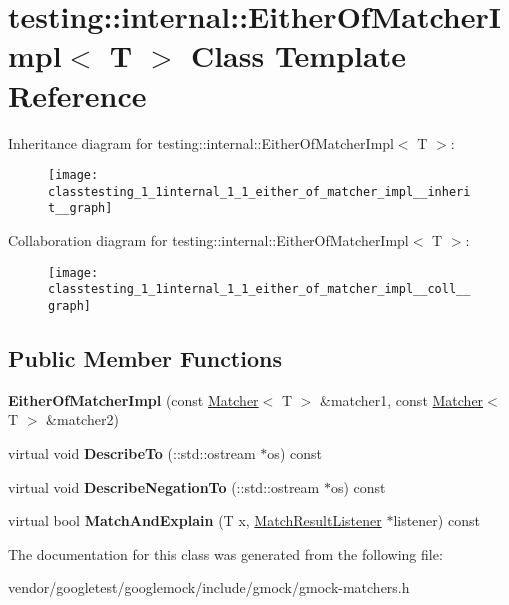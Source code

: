 \hypertarget{classtesting_1_1internal_1_1_either_of_matcher_impl}{}\section{testing\+:\+:internal\+:\+:Either\+Of\+Matcher\+Impl$<$ T $>$ Class Template Reference}
\label{classtesting_1_1internal_1_1_either_of_matcher_impl}


Inheritance diagram for testing\+:\+:internal\+:\+:Either\+Of\+Matcher\+Impl$<$ T $>$\+:
\nopagebreak
\begin{figure}[H]
\begin{center}
\leavevmode
\texttt{[image: classtesting\_1\_1internal\_1\_1\_either\_of\_matcher\_impl\_\_inherit\_\_graph]}
\end{center}
\end{figure}


Collaboration diagram for testing\+:\+:internal\+:\+:Either\+Of\+Matcher\+Impl$<$ T $>$\+:
\nopagebreak
\begin{figure}[H]
\begin{center}
\leavevmode
\texttt{[image: classtesting\_1\_1internal\_1\_1\_either\_of\_matcher\_impl\_\_coll\_\_graph]}
\end{center}
\end{figure}
\subsection*{Public Member Functions}
\begin{DoxyCompactItemize}
\item 
\mbox{\label{classtesting_1_1internal_1_1_either_of_matcher_impl_af7008f5d8f2950fbe75e6ff9b78af584}} 
{\bfseries Either\+Of\+Matcher\+Impl} (const \mbox{\hyperlink{classtesting_1_1_matcher}{Matcher}}$<$ T $>$ \&matcher1, const \mbox{\hyperlink{classtesting_1_1_matcher}{Matcher}}$<$ T $>$ \&matcher2)
\item 
\mbox{\label{classtesting_1_1internal_1_1_either_of_matcher_impl_a0389690d0ce06a1ca447db6281a380d3}} 
virtual void {\bfseries Describe\+To} (\+::std\+::ostream $\ast$os) const
\item 
\mbox{\label{classtesting_1_1internal_1_1_either_of_matcher_impl_ab5a4eac981acde377a4fd344507b1d71}} 
virtual void {\bfseries Describe\+Negation\+To} (\+::std\+::ostream $\ast$os) const
\item 
\mbox{\label{classtesting_1_1internal_1_1_either_of_matcher_impl_af00ed8cd85c36f1e862bf85f776cee3b}} 
virtual bool {\bfseries Match\+And\+Explain} (T x, \mbox{\hyperlink{classtesting_1_1_match_result_listener}{Match\+Result\+Listener}} $\ast$listener) const
\end{DoxyCompactItemize}


The documentation for this class was generated from the following file\+:\begin{DoxyCompactItemize}
\item 
vendor/googletest/googlemock/include/gmock/gmock-\/matchers.\+h\end{DoxyCompactItemize}
